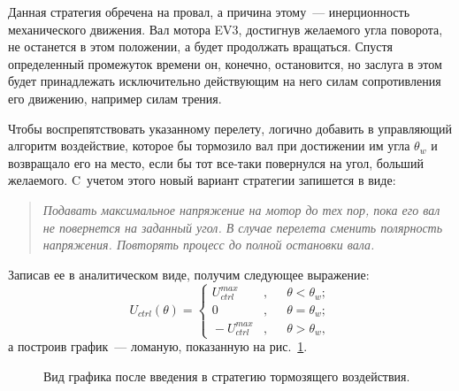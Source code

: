 \documentclass[12pt,a4paper,openany]{extarticle}
\begin{document}
Данная стратегия обречена на провал, а причина этому~--- инерционность механического движения.
Вал мотора EV3, достигнув желаемого угла поворота, не останется в этом положении, а будет продолжать вращаться.
Спустя определенный промежуток времени он, конечно, остановится, но заслуга в этом будет принадлежать исключительно действующим на него силам сопротивления его движению, например силам трения.

Чтобы воспрепятствовать указанному перелету, логично добавить в управляющий алгоритм воздействие, которое бы тормозило вал при достижении им угла $\theta_w$ и возвращало его на место, если бы тот все-таки повернулся на угол, больший желаемого.
C~учетом этого новый вариант стратегии запишется в виде:
\begin{quote}
\textsl{Подавать максимальное напряжение на мотор до тех пор, пока его вал не повернется на заданный угол.
В случае перелета сменить полярность напряжения.
Повторять процесс до полной остановки вала.} 
\end{quote}
Записав ее в аналитическом виде, получим следующее выражение:
\begin{equation}
	U_{ctrl}(\theta) = 
	\left\{
	\begin{aligned}
		\!U_{ctrl}^{max}\!&, &&\theta < \theta_w; \\
		\!0&, &&\theta = \theta_w; \\		
		\!-U_{ctrl}^{max}\!&, &&\theta > \theta_w, 
	\end{aligned}
	\right.
\end{equation}
а построив график~--- ломаную, показанную на рис.~\ref{2_graph}.

\begin{figure}[h]
	\noindent{}
	\caption{Вид графика после введения в стратегию тормозящего воздействия.}
	\label{2_graph}
\end{figure}
\end{document}
